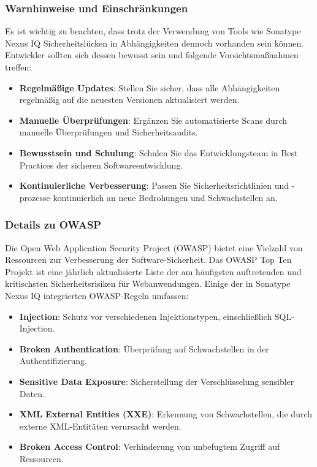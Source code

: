 \subsubsection{Warnhinweise und Einschränkungen}

Es ist wichtig zu beachten, dass trotz der Verwendung von Tools wie Sonatype Nexus IQ Sicherheitslücken in Abhängigkeiten dennoch vorhanden sein können. Entwickler sollten sich dessen bewusst sein und folgende Vorsichtsmaßnahmen treffen:

\begin{itemize}
    \item \textbf{Regelmäßige Updates}: Stellen Sie sicher, dass alle Abhängigkeiten regelmäßig auf die neuesten Versionen aktualisiert werden.
    \item \textbf{Manuelle Überprüfungen}: Ergänzen Sie automatisierte Scans durch manuelle Überprüfungen und Sicherheitsaudits.
    \item \textbf{Bewusstsein und Schulung}: Schulen Sie das Entwicklungsteam in Best Practices der sicheren Softwareentwicklung.
    \item \textbf{Kontinuierliche Verbesserung}: Passen Sie Sicherheitsrichtlinien und -prozesse kontinuierlich an neue Bedrohungen und Schwachstellen an.
\end{itemize}

\subsubsection{Details zu OWASP}

Die Open Web Application Security Project (OWASP) bietet eine Vielzahl von Ressourcen zur Verbesserung der Software-Sicherheit. Das OWASP Top Ten Projekt ist eine jährlich aktualisierte Liste der am häufigsten auftretenden und kritischsten Sicherheitsrisiken für Webanwendungen. Einige der in Sonatype Nexus IQ integrierten OWASP-Regeln umfassen:

\begin{itemize}
    \item \textbf{Injection}: Schutz vor verschiedenen Injektionstypen, einschließlich SQL-Injection.
    \item \textbf{Broken Authentication}: Überprüfung auf Schwachstellen in der Authentifizierung.
    \item \textbf{Sensitive Data Exposure}: Sicherstellung der Verschlüsselung sensibler Daten.
    \item \textbf{XML External Entities (XXE)}: Erkennung von Schwachstellen, die durch externe XML-Entitäten verursacht werden.
    \item \textbf{Broken Access Control}: Verhinderung von unbefugtem Zugriff auf Ressourcen.
\end{itemize}

